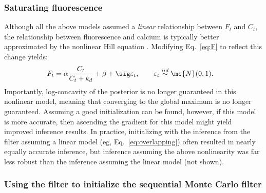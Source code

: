 \subsubsection{Saturating fluorescence}

Although all the above models assumed a \emph{linear} relationship between $F_t$ and $C_t$, the relationship between fluorescence and calcium is typically better approximated by the nonlinear Hill equation \cite{PologrutoSvoboda04}. Modifying Eq.~\eqref{eq:F} to reflect this change yields: 
\begin{align}
	F_t &= \alpha \frac{C_t}{C_t+k_d} + \beta +  \sig \varepsilon_t, \qquad \varepsilon_t \overset{iid}{\sim} \mc{N}(0,1).
\end{align}
Importantly, log-concavity of the posterior is no longer guaranteed in this nonlinear model, meaning that converging to the global maximum is no longer guaranteed.  Assuming a good initialization can be found, however, if this model is more accurate, then ascending the gradient for this model might yield improved inference results.  In practice, initializing with the  inference from the \foopsi filter assuming a linear model (eg, Eq.~\eqref{eq:overlapping}) often resulted in nearly equally accurate inference, but inference assuming the above nonlinearity was far less robust than the inference assuming the linear model (not shown).  

\subsubsection{Using the \foopsi filter to initialize the sequential Monte Carlo filter}


